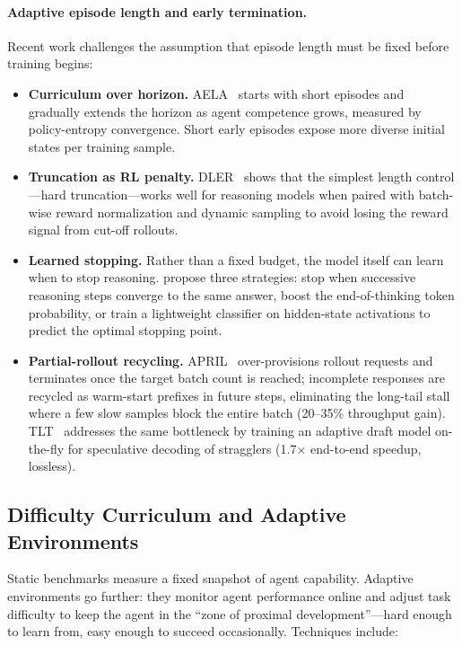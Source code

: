 \paragraph{Adaptive episode length and early termination.}
\label{adaptive-episode-length-and-early-termination.}

Recent work challenges the assumption that episode length must be fixed before training begins:

\begin{itemize}
  \item \textbf{Curriculum over horizon.} AELA~\cite{yoo2025aela} starts with short episodes and gradually extends the horizon as agent competence grows, measured by policy-entropy convergence. Short early episodes expose more diverse initial states per training sample.
  \item \textbf{Truncation as RL penalty.} DLER~\cite{liu2025dler} shows that the simplest length control---hard truncation---works well for reasoning models when paired with batch-wise reward normalization and dynamic sampling to avoid losing the reward signal from cut-off rollouts.
  \item \textbf{Learned stopping.} Rather than a fixed budget, the model itself can learn when to stop reasoning. \cite{liu2025answerstop} propose three strategies: stop when successive reasoning steps converge to the same answer, boost the end-of-thinking token probability, or train a lightweight classifier on hidden-state activations to predict the optimal stopping point.
  \item \textbf{Partial-rollout recycling.} APRIL~\cite{april2025} over-provisions rollout requests and terminates once the target batch count is reached; incomplete responses are recycled as warm-start prefixes in future steps, eliminating the long-tail stall where a few slow samples block the entire batch (20--35\% throughput gain). TLT~\cite{hu2025tlt} addresses the same bottleneck by training an adaptive draft model on-the-fly for speculative decoding of stragglers (1.7$\times$ end-to-end speedup, lossless).
\end{itemize}

\subsection{Difficulty Curriculum and Adaptive Environments}
\label{difficulty-curriculum-and-adaptive-environments}

Static benchmarks measure a fixed snapshot of agent capability. Adaptive environments go further: they monitor agent performance online and adjust task difficulty to keep the agent in the ``zone of proximal development''---hard enough to learn from, easy enough to succeed occasionally. Techniques include:

